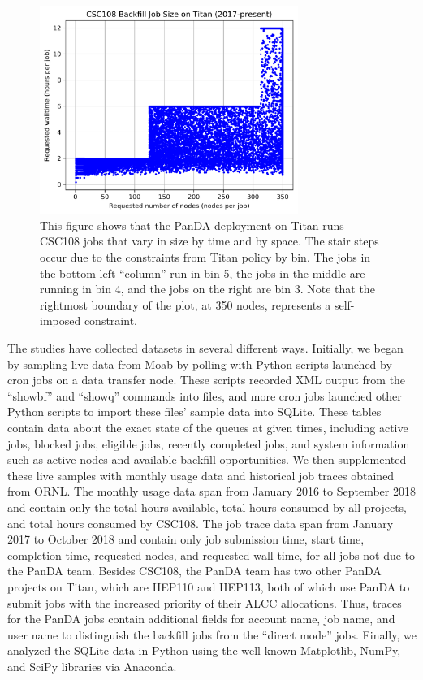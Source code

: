 \begin{figure}
  \includegraphics[width=0.75\textwidth]{images/time-vs-nodes-backfill.png}
\caption{This figure shows that the PanDA deployment on Titan runs CSC108 jobs
that vary in size by time and by space. The stair steps occur due to the
constraints from Titan policy by bin. The jobs in the bottom left ``column''
run in bin 5, the jobs in the middle are running in bin 4, and the jobs on the
right are bin 3. Note that the rightmost boundary of the plot, at 350 nodes,
represents a self-imposed constraint.}
\label{fig:time-vs-nodes}
\end{figure}

The studies have collected datasets in several different ways. Initially, we
began by sampling live data from Moab by polling with Python scripts launched
by cron jobs on a data transfer node. These scripts recorded XML output from
the ``showbf'' and ``showq'' commands into files, and more cron jobs launched
other Python scripts to import these files' sample data into SQLite. These
tables contain data about the exact state of the queues at given times,
including active jobs, blocked jobs, eligible jobs, recently completed jobs,
and system information such as active nodes and available backfill
opportunities. We then supplemented these live samples with monthly usage data
and historical job traces obtained from ORNL. The monthly usage data span from
January 2016 to September 2018 and contain only the total hours available,
total hours consumed by all projects, and total hours consumed by CSC108. The
job trace data span from January 2017 to October 2018 and contain only job
submission time, start time, completion time, requested nodes, and requested
wall time, for all jobs not due to the PanDA team. Besides CSC108, the PanDA
team has two other PanDA projects on Titan, which are HEP110 and HEP113, both
of which use PanDA to submit jobs with the increased priority of their ALCC
allocations. Thus, traces for the PanDA jobs contain additional fields for
account name, job name, and user name to distinguish the backfill jobs from the
``direct mode'' jobs. Finally, we analyzed the SQLite data in Python using the
well-known Matplotlib, NumPy, and SciPy libraries via Anaconda.

